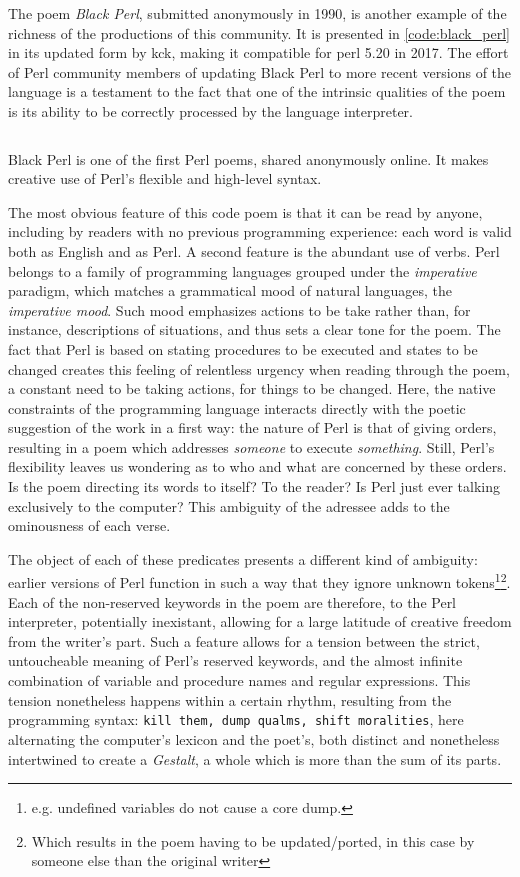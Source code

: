 The poem \emph{Black Perl}, submitted anonymously in 1990, is another example of the richness of the productions of this community. It is presented in \ref{code:black_perl} in its updated form by kck, making it compatible for perl 5.20 in 2017. The effort of Perl community members of updating Black Perl to more recent versions of the language is a testament to the fact that one of the intrinsic qualities of the poem is its ability to be correctly processed by the language interpreter.

\begin{listing}
  \inputminted{perl}{./corpus/black_perl.pl}
  \caption{Black Perl is one of the first Perl poems, shared anonymously online. It makes creative use of Perl's flexible and high-level syntax.}
  \label{code:black_perl}
\end{listing}

The most obvious feature of this code poem is that it can be read by anyone, including by readers with no previous programming experience: each word is valid both as English and as Perl. A second feature is the abundant use of verbs. Perl belongs to a family of programming languages grouped under the \emph{imperative} paradigm, which matches a grammatical mood of natural languages, the \emph{imperative mood}. Such mood emphasizes actions to be take rather than, for instance, descriptions of situations, and thus sets a clear tone for the poem. The fact that Perl is based on stating procedures to be executed and states to be changed creates this feeling of relentless urgency when reading through the poem, a constant need to be taking actions, for things to be changed. Here, the native constraints of the programming language interacts directly with the poetic suggestion of the work in a first way: the nature of Perl is that of giving orders, resulting in a poem which addresses \emph{someone} to execute \emph{something}. Still, Perl's flexibility leaves us wondering as to who and what are concerned by these orders. Is the poem directing its words to itself? To the reader? Is Perl just ever talking exclusively to the computer? This ambiguity of the adressee adds to the ominousness of each verse.

The object of each of these predicates presents a different kind of ambiguity: earlier versions of Perl function in such a way that they ignore unknown tokens\footnote{e.g. undefined variables do not cause a core dump.}\footnote{Which results in the poem having to be updated/ported, in this case by someone else than the original writer}. Each of the non-reserved keywords in the poem are therefore, to the Perl interpreter, potentially inexistant, allowing for a large latitude of creative freedom from the writer's part. Such a feature allows for a tension between the strict, untoucheable meaning of Perl's reserved keywords, and the almost infinite combination of variable and procedure names and regular expressions. This tension nonetheless happens within a certain rhythm, resulting from the programming syntax: \lstinline{kill them, dump qualms, shift moralities}, here alternating the computer's lexicon and the poet's, both distinct and nonetheless intertwined to create a \emph{Gestalt}, a whole which is more than the sum of its parts.


